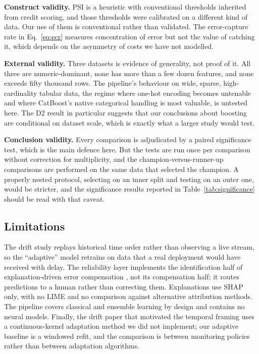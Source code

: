 \documentclass{ieeeaccess}
\begin{document}
\textbf{Construct validity.} PSI is a heuristic with conventional thresholds inherited from credit scoring, and those thresholds were calibrated on a different kind of data. Our use of them is conventional rather than validated. The error-capture rate in Eq.~\eqref{eq:ecr} measures concentration of error but not the value of catching it, which depends on the asymmetry of costs we have not modelled.

\textbf{External validity.} Three datasets is evidence of generality, not proof of it. All three are numeric-dominant, none has more than a few dozen features, and none exceeds fifty thousand rows. The pipeline's behaviour on wide, sparse, high-cardinality tabular data, the regime where one-hot encoding becomes untenable and where CatBoost's native categorical handling is most valuable, is untested here. The D2 result in particular suggests that our conclusions about boosting are conditional on dataset scale, which is exactly what a larger study would test.

\textbf{Conclusion validity.} Every comparison is adjudicated by a paired significance test, which is the main defence here. But the tests are run once per comparison without correction for multiplicity, and the champion-versus-runner-up comparisons are performed on the same data that selected the champion. A properly nested protocol, selecting on an inner split and testing on an outer one, would be stricter, and the significance results reported in Table~\ref{tab:significance} should be read with that caveat.

\subsection{Limitations}
The drift study replays historical time order rather than observing a live stream, so the ``adaptive'' model retrains on data that a real deployment would have received with delay. The reliability layer implements the identification half of explanation-driven error compensation \cite{shapcomp2025}, not its compensation half; it routes predictions to a human rather than correcting them. Explanations use SHAP only, with no LIME and no comparison against alternative attribution methods. The pipeline covers classical and ensemble learning by design and contains no neural models. Finally, the drift paper that motivated the temporal framing uses a continuous-kernel adaptation method we did not implement; our adaptive baseline is a windowed refit, and the comparison is between monitoring policies rather than between adaptation algorithms.
\end{document}
